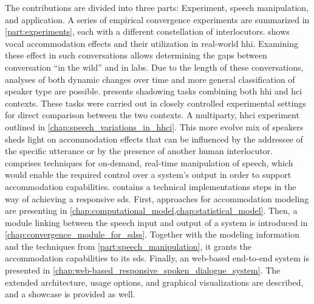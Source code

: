 The contributions are divided into three parts: Experiment, speech manipulation, and application.
A series of empirical convergence experiments are summarized in \cref{part:experiments}, each with a different constellation of interlocutors.
 shows vocal accommodation effects and their utilization in real-world \acl{hhi}.
Examining these effect in such conversations  allows determining the gaps between conversation \enquote{in the wild} and in labs.
Due to the length of these conversations, analyses of both dynamic changes over time and more general classification of speaker type are possible.
 presents shadowing tasks combining both \acl{hhi} and \acl{hci} contexts.
These tasks were carried out in closely controlled experimental settings for direct comparison between the two contexts.
A multiparty, \acl{hhci} experiment outlined in \cref{chap:speech_variations_in_hhci}.
This more evolve mix of speakers sheds light on accommodation effects that can be influenced by the addressee of the specific utterance or by the presence of another human interlocutor.
 comprises techniques for on-demand, real-time manipulation of speech, which would enable the required control over a system's output in order to support accommodation capabilities.
\noindent{} contains a technical implementations steps in the way of achieving a responsive \acl{sds}.
First, approaches for accommodation modeling are presenting in \cref{chap:computational_model,chap:statistical_model}.
Then, a module linking between the speech input and output of a system is introduced in \cref{chap:convergence_module_for_sdss}.
Together with the modeling information and the techniques from \cref{part:speech_manipulation}, it grants the accommodation capabilities to its \acl{sds}.
Finally, an web-based end-to-end system is presented in \cref{chap:web-based_responsive_spoken_dialogue_system}.
The extended architecture, usage options, and  graphical visualizations are described, and a showcase is provided as well.
